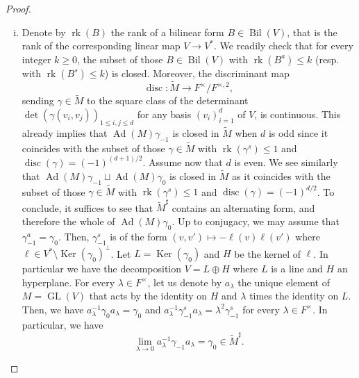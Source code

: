 \documentclass[12pt]{article}
\numberwithin{equation}{section}
\def\tM{\widetilde{M}}
\def\tm{\widetilde{m}}
\DeclareMathOperator{\Ker}{Ker}
\DeclareMathOperator{\Ad}{Ad}
\DeclareMathOperator{\Bil}{Bil}
\DeclareMathOperator{\disc}{disc}
\DeclareMathOperator{\GL}{\mathrm{GL}}
\DeclareMathOperator{\rk}{\mathrm{rk}}
\begin{document}
\begin{proof}
\begin{enumerate}[(i)]
			\item Denote by $\rk(B)$ the rank of a bilinear form $B\in \Bil(V)$, that is the rank of the corresponding linear map $V\to V^*$. We readily check that for every integer $k\geq 0$, the subset of those $B\in \Bil(V)$ with $\rk(B^a)\leq k$ (resp. with $\rk(B^s)\leq k$) is closed. Moreover, the discriminant map
			$$\disc: \tM\to F^\times/F^{\times,2},$$
			sending $\gamma\in \tM$ to the square class of the determinant $\det(\gamma(v_i,v_j))_{1\leq i,j\leq d}$ for any basis $(v_i)_{i=1}^d$ of $V$, is continuous. This already implies that $\Ad(M)\gamma_{-1}$ is closed in $\tM$ when $d$ is odd since it coincides with the subset of those $\gamma\in \tM$ with $\rk(\gamma^s)\leq 1$ and $\disc(\gamma)=(-1)^{(d+1)/2}$. Assume now that $d$ is even. We see similarly that $\Ad(M)\gamma_{-1}\sqcup \Ad(M)\gamma_0$ is closed in $\tM$ as it coincides with the subset of those $\gamma\in \tM$ with $\rk(\gamma^s)\leq 1$ and $\disc(\gamma)=(-1)^{d/2}$. To conclude, it suffices to see that $\tM^\sharp$ contains an alternating form, and therefore the whole of $\Ad(M)\gamma_0$. Up to conjugacy, we may assume that $\gamma_{-1}^a=\gamma_0$. Then, $\gamma_{-1}^s$ is of the form $(v,v')\mapsto -\ell(v)\ell(v')$ where $\ell\in V^*\setminus \Ker(\gamma_0)^{\perp}$. Let $L=\Ker(\gamma_0)$ and $H$ be the kernel of $\ell$. In particular we have the decomposition $V=L\oplus H$ where $L$ is a line and $H$ an hyperplane. For every $\lambda\in F^\times$, let us denote by $a_\lambda$ the unique element of $M=\GL(V)$ that acts by the identity on $H$ and $\lambda$ times the identity on $L$. Then, we have $a_{\lambda}^{-1}\gamma_0a_\lambda=\gamma_0$ and $a_{\lambda}^{-1}\gamma_{-1}^sa_\lambda=\lambda^2\gamma_{-1}^s$ for every $\lambda\in F^\times$. In particular, we have
			$$\lim\limits_{\lambda\to 0} a_{\lambda}^{-1}\gamma_{-1}a_\lambda=\gamma_0\in \tM^\sharp.$$
		\end{enumerate}
	\end{proof}
	
	
\end{document}
